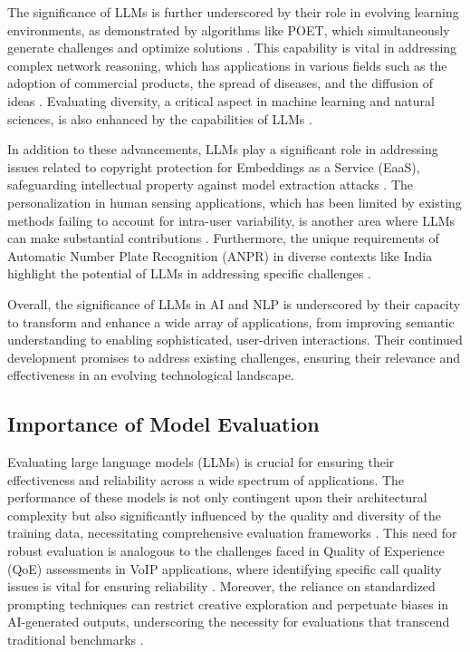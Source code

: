 The significance of LLMs is further underscored by their role in evolving learning environments, as demonstrated by algorithms like POET, which simultaneously generate challenges and optimize solutions \cite{wang2019pairedopenendedtrailblazerpoet}. This capability is vital in addressing complex network reasoning, which has applications in various fields such as the adoption of commercial products, the spread of diseases, and the diffusion of ideas \cite{shakarian2022reasoningcomplexnetworkslogic}. Evaluating diversity, a critical aspect in machine learning and natural sciences, is also enhanced by the capabilities of LLMs \cite{pasarkar2024cousinsvendiscorefamily}.



In addition to these advancements, LLMs play a significant role in addressing issues related to copyright protection for Embeddings as a Service (EaaS), safeguarding intellectual property against model extraction attacks \cite{wang2024espewrobustcopyrightprotection}. The personalization in human sensing applications, which has been limited by existing methods failing to account for intra-user variability, is another area where LLMs can make substantial contributions \cite{kaur2024cropcontextwiserobuststatic}. Furthermore, the unique requirements of Automatic Number Plate Recognition (ANPR) in diverse contexts like India highlight the potential of LLMs in addressing specific challenges \cite{adak2022automaticnumberplaterecognition}.



Overall, the significance of LLMs in AI and NLP is underscored by their capacity to transform and enhance a wide array of applications, from improving semantic understanding to enabling sophisticated, user-driven interactions. Their continued development promises to address existing challenges, ensuring their relevance and effectiveness in an evolving technological landscape.



\subsection{Importance of Model Evaluation} \label{subsec:Importance of Model Evaluation}



Evaluating large language models (LLMs) is crucial for ensuring their effectiveness and reliability across a wide spectrum of applications. The performance of these models is not only contingent upon their architectural complexity but also significantly influenced by the quality and diversity of the training data, necessitating comprehensive evaluation frameworks \cite{touvron2023llama}. This need for robust evaluation is analogous to the challenges faced in Quality of Experience (QoE) assessments in VoIP applications, where identifying specific call quality issues is vital for ensuring reliability \cite{gupchup2018analysisproblemtokensrank}. Moreover, the reliance on standardized prompting techniques can restrict creative exploration and perpetuate biases in AI-generated outputs, underscoring the necessity for evaluations that transcend traditional benchmarks \cite{palmini2024patternscreativityuserinput}.



